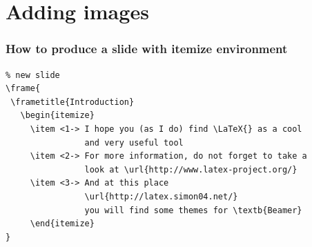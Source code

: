 \section{Adding images}

\begin{frame}[fragile]\small
  \frametitle{How to produce a slide with \textbf{itemize} environment}
    \begin{verbatim}
% new slide
\frame{
 \frametitle{Introduction}
   \begin{itemize}
     \item <1-> I hope you (as I do) find \LaTeX{} as a cool 
                and very useful tool
     \item <2-> For more information, do not forget to take a 
                look at \url{http://www.latex-project.org/}
     \item <3-> And at this place 
                \url{http://latex.simon04.net/} 
                you will find some themes for \textb{Beamer}
     \end{itemize}
}  
\end{verbatim}
\end{frame}


